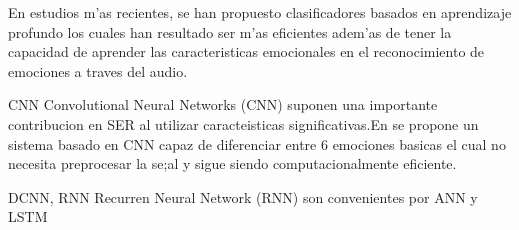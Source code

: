 \documentclass[11pt,a4paper,spanish]{book}
\begin{document}
		En estudios m'as recientes, se han propuesto clasificadores basados en aprendizaje profundo los cuales han resultado ser m'as eficientes adem'as de tener la capacidad de aprender las caracteristicas emocionales en el reconocimiento de emociones a traves del audio.
		
		CNN
		Convolutional Neural Networks (CNN) suponen una importante contribucion en SER al utilizar caracteisticas significativas.En \cite{AbdulQayyum2019} se propone un sistema basado en CNN capaz de diferenciar entre 6 emociones basicas el cual no necesita preprocesar la se;al y sigue siendo computacionalmente eficiente.
		
		DCNN, 
		RNN 
		Recurren Neural Network (RNN) son convenientes por 
		ANN y 
		LSTM
		
		\printbibliography
	
\end{document}
